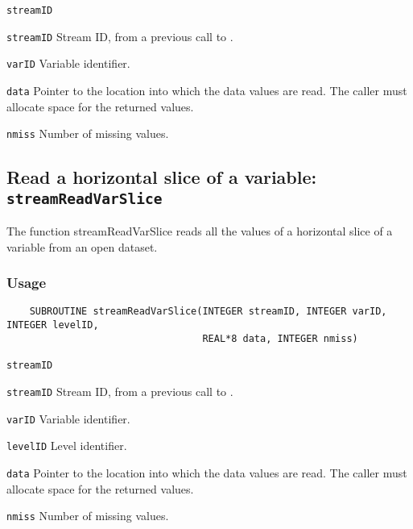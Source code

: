 \hspace*{4mm}\begin{minipage}[]{15cm}
\begin{deflist}{\texttt{streamID}\ }
\item[\texttt{streamID}]
Stream ID, from a previous call to {}.
\item[\texttt{varID}]
Variable identifier.
\item[\texttt{data}]
Pointer to the location into which the data values are read.
                     The caller must allocate space for the returned values.
\item[\texttt{nmiss}]
Number of missing values.

\end{deflist}
\end{minipage}


\subsection{Read a horizontal slice of a variable: \texttt{streamReadVarSlice}}
\label{streamReadVarSlice}

The function streamReadVarSlice reads all the values of a horizontal slice of a variable
from an open dataset.
\subsubsection*{Usage}

\begin{verbatim}
    SUBROUTINE streamReadVarSlice(INTEGER streamID, INTEGER varID, INTEGER levelID, 
                                  REAL*8 data, INTEGER nmiss)
\end{verbatim}

\hspace*{4mm}\begin{minipage}[]{15cm}
\begin{deflist}{\texttt{streamID}\ }
\item[\texttt{streamID}]
Stream ID, from a previous call to {}.
\item[\texttt{varID}]
Variable identifier.
\item[\texttt{levelID}]
Level identifier.
\item[\texttt{data}]
Pointer to the location into which the data values are read.
                     The caller must allocate space for the returned values.
\item[\texttt{nmiss}]
Number of missing values.

\end{deflist}
\end{minipage}


